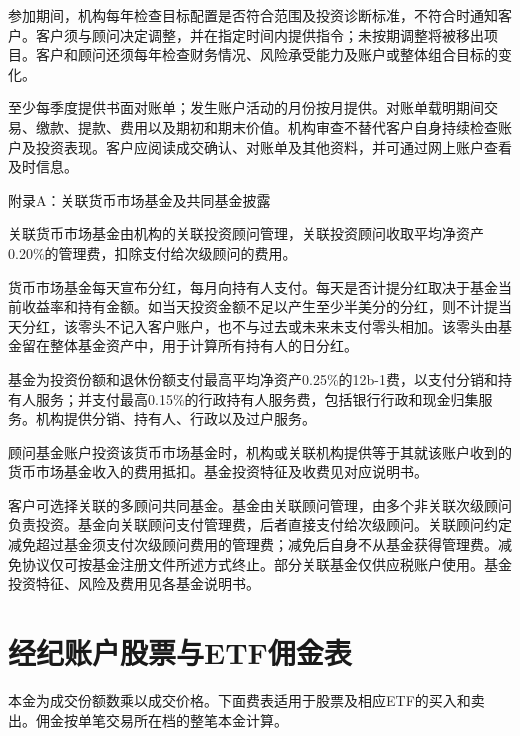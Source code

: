 \documentclass[UTF8,fontset=none,11pt,a4paper]{ctexart}
\begin{document}
参加期间，机构每年检查目标配置是否符合范围及投资诊断标准，不符合时通知客户。客户须与顾问决定调整，并在指定时间内提供指令；未按期调整将被移出项目。客户和顾问还须每年检查财务情况、风险承受能力及账户或整体组合目标的变化。


至少每季度提供书面对账单；发生账户活动的月份按月提供。对账单载明期间交易、缴款、提款、费用以及期初和期末价值。机构审查不替代客户自身持续检查账户及投资表现。客户应阅读成交确认、对账单及其他资料，并可通过网上账户查看及时信息。


附录A：关联货币市场基金及共同基金披露


关联货币市场基金由机构的关联投资顾问管理，关联投资顾问收取平均净资产0.20\%的管理费，扣除支付给次级顾问的费用。


货币市场基金每天宣布分红，每月向持有人支付。每天是否计提分红取决于基金当前收益率和持有金额。如当天投资金额不足以产生至少半美分的分红，则不计提当天分红，该零头不记入客户账户，也不与过去或未来未支付零头相加。该零头由基金留在整体基金资产中，用于计算所有持有人的日分红。


基金为投资份额和退休份额支付最高平均净资产0.25\%的12b-1费，以支付分销和持有人服务；并支付最高0.15\%的行政持有人服务费，包括银行行政和现金归集服务。机构提供分销、持有人、行政以及过户服务。


顾问基金账户投资该货币市场基金时，机构或关联机构提供等于其就该账户收到的货币市场基金收入的费用抵扣。基金投资特征及收费见对应说明书。


客户可选择关联的多顾问共同基金。基金由关联顾问管理，由多个非关联次级顾问负责投资。基金向关联顾问支付管理费，后者直接支付给次级顾问。关联顾问约定减免超过基金须支付次级顾问费用的管理费；减免后自身不从基金获得管理费。减免协议仅可按基金注册文件所述方式终止。部分关联基金仅供应税账户使用。基金投资特征、风险及费用见各基金说明书。


\section*{经纪账户股票与ETF佣金表}
本金为成交份额数乘以成交价格。下面费表适用于股票及相应ETF的买入和卖出。佣金按单笔交易所在档的整笔本金计算。
\end{document}
